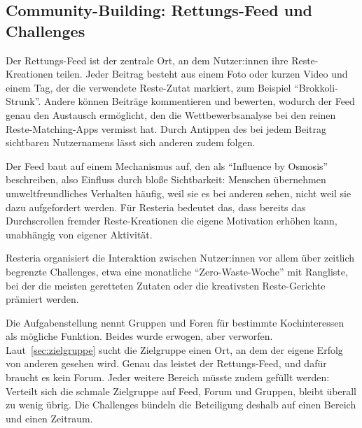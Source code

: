 \subsection{Community-Building: Rettungs-Feed und Challenges}\label{sec:community_und_feedback}

Der Rettungs-Feed ist der zentrale Ort, an dem Nutzer:innen ihre Reste-Kreationen teilen. Jeder Beitrag besteht aus einem Foto oder kurzen Video und einem Tag, der die verwendete Reste-Zutat markiert, zum Beispiel \enquote{Brokkoli-Strunk}. Andere können Beiträge kommentieren und bewerten, wodurch der Feed genau den Austausch ermöglicht, den die Wettbewerbsanalyse bei den reinen Reste-Matching-Apps vermisst hat. Durch Antippen des bei jedem Beitrag sichtbaren Nutzernamens lässt sich anderen zudem folgen.

Der Feed baut auf einem Mechanismus auf, den \textcite[S. 4, 6]{shenInfluenceOsmosisSocial2023} als \enquote{Influence by Osmosis} beschreiben, also Einfluss durch bloße Sichtbarkeit: Menschen übernehmen umweltfreundliches Verhalten häufig, weil sie es bei anderen sehen, nicht weil sie dazu aufgefordert werden. Für Resteria bedeutet das, dass bereits das Durchscrollen fremder Reste-Kreationen die eigene Motivation erhöhen kann, unabhängig von eigener Aktivität.

Resteria organisiert die Interaktion zwischen Nutzer:innen vor allem über zeitlich begrenzte Challenges, etwa eine monatliche \enquote{Zero-Waste-Woche} mit Rangliste, bei der die meisten geretteten Zutaten oder die kreativsten Reste-Gerichte prämiert werden.

Die Aufgabenstellung nennt Gruppen und Foren für bestimmte Kochinteressen als mögliche Funktion. Beides wurde erwogen, aber verworfen. Laut~\autoref{sec:zielgruppe} sucht die Zielgruppe einen Ort, an dem der eigene Erfolg von anderen gesehen wird. Genau das leistet der Rettungs-Feed, und dafür braucht es kein Forum. Jeder weitere Bereich müsste zudem gefüllt werden: Verteilt sich die schmale Zielgruppe auf Feed, Forum und Gruppen, bleibt überall zu wenig übrig. Die Challenges bündeln die Beteiligung deshalb auf einen Bereich und einen Zeitraum.
